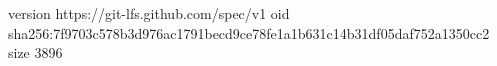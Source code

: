 version https://git-lfs.github.com/spec/v1
oid sha256:7f9703c578b3d976ac1791becd9ce78fe1a1b631c14b31df05daf752a1350cc2
size 3896
